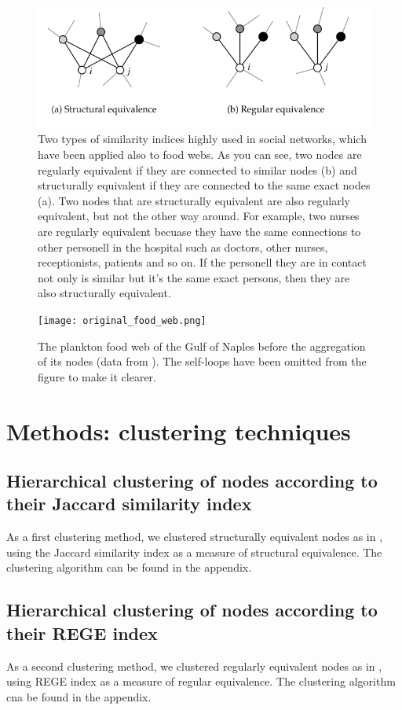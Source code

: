 \documentclass[twocolumn]{article}
\begin{document}
	\begin{figure}[htbp]%
		\centering
		\includegraphics[width=.8\linewidth]{reg_struct_equivalence}
		\caption{Two types of similarity indices highly used in social networks, which have been applied also to food webs. As you can see, two nodes are regularly equivalent if they are connected to similar nodes (b) and structurally equivalent if they are connected to the same exact nodes (a). Two nodes that are structurally equivalent are also regularly equivalent, but not the other way around. For example, two nurses are regularly equivalent becuase they have the same connections to other personell in the hospital such as doctors, other nurses, receptionists, patients and so on. If the personell they are in contact not only is similar but it's the same exact persons, then they are also structurally equivalent.}
		\label{fig:equivalences}
	\end{figure}
	\begin{figure}[htbp]%
		\centering
		\texttt{[image: original\_food\_web.png]}
		\caption{The plankton food web of the Gulf of Naples before the aggregation of its nodes (data from \citet{DAlelio2016}). The self-loops have been omitted from the figure to make it clearer.}
		\label{fig:originalweb}
	\end{figure}
\section*{Methods: clustering techniques}
	\subsection*{Hierarchical clustering of nodes according to their Jaccard similarity index}
	As a first clustering method, we clustered structurally equivalent nodes as in \citet{Yodzis1999}, using the Jaccard similarity index as a measure of structural equivalence. The clustering algorithm can be found in the appendix.
	\subsection*{Hierarchical clustering of nodes according to their REGE index}
	As a second clustering method, we clustered regularly equivalent nodes as in \citet{Luczkovich2003}, using REGE index as a measure of regular equivalence. The clustering algorithm cna be found in the appendix.
\end{document}
